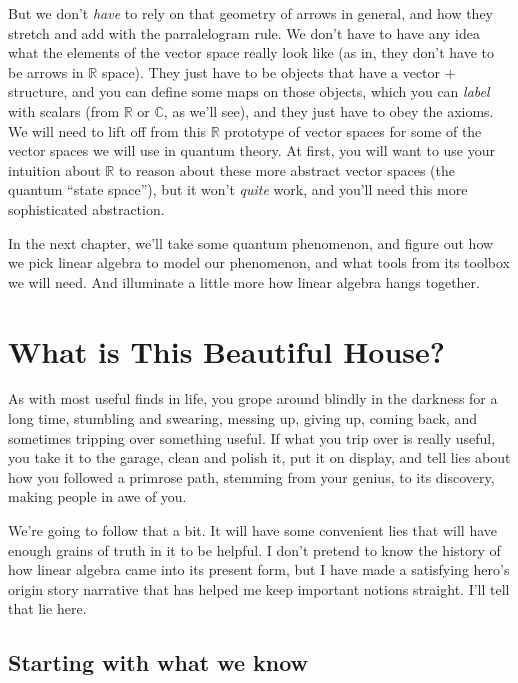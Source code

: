 \documentclass[
]{book}
\begin{document}
But we don't \emph{have} to rely on that geometry of arrows in general, and how they stretch and add with the parralelogram rule. We don't have to have any idea what the elements of the vector space really look like (as in, they don't have to be arrows in \(\mathbb{R}\) space). They just have to be objects that have a vector \(+\) structure, and you can define some maps on those objects, which you can \emph{label} with scalars (from \(\mathbb{R}\) or \(\mathbb{C}\), as we'll see), and they just have to obey the axioms. We will need to lift off from this \(\mathbb{R}\) prototype of vector spaces for some of the vector spaces we will use in quantum theory. At first, you will want to use your intuition about \(\mathbb{R}\) to reason about these more abstract vector spaces (the quantum ``state space''), but it won't \emph{quite} work, and you'll need this more sophisticated abstraction.

In the next chapter, we'll take some quantum phenomenon, and figure out how we pick linear algebra to model our phenomenon, and what tools from its toolbox we will need. And illuminate a little more how linear algebra hangs together.

\hypertarget{what-is-this-beautiful-house}{%
\chapter{What is This Beautiful House?}\label{what-is-this-beautiful-house}}

As with most useful finds in life, you grope around blindly in the darkness for a long time, stumbling and swearing, messing up, giving up, coming back, and sometimes tripping over something useful. If what you trip over is really useful, you take it to the garage, clean and polish it, put it on display, and tell lies about how you followed a primrose path, stemming from your genius, to its discovery, making people in awe of you.

We're going to follow that a bit. It will have some convenient lies that will have enough grains of truth in it to be helpful. I don't pretend to know the history of how linear algebra came into its present form, but I have made a satisfying hero's origin story narrative that has helped me keep important notions straight. I'll tell that lie here.

\hypertarget{starting-with-what-we-know}{%
\section{Starting with what we know}\label{starting-with-what-we-know}}
\end{document}
